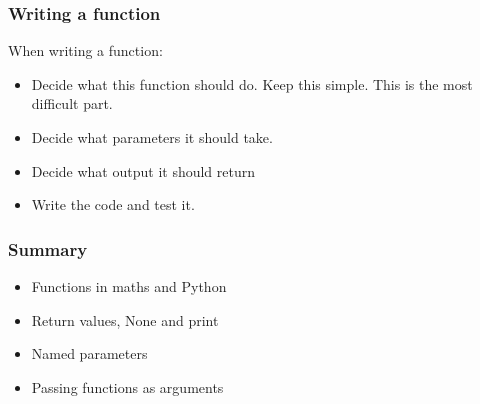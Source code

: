 \documentclass{beamer}
\begin{document}
\begin{frame}
\frametitle{Writing a function}
When writing a function:
\begin{itemize}
\item Decide what this function should do. Keep this simple. This is
  the most difficult part. 
\item Decide what parameters it should take.
\item Decide what output it should return
\item Write the code and test it.
\end{itemize}
\end{frame}

\begin{frame}
\frametitle{Summary}
\begin{itemize}
\item Functions in maths and Python
\item Return values, None and print
\item Named parameters
\item Passing functions as arguments
\end{itemize}
\end{frame}
\end{document}

